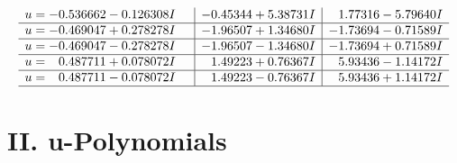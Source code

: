\documentclass[1p]{elsarticle_modified}
\theoremstyle{definition}
\begin{document}
$$\begin{array}{c|c|c}
\begin{aligned}
u &= -0.536662 - 0.126308 I\end{aligned}
 & -0.45344 + 5.38731 I & \phantom{-}1.77316 - 5.79640 I \\ \hline\begin{aligned}
u &= -0.469047 + 0.278278 I\end{aligned}
 & -1.96507 + 1.34680 I & -1.73694 - 0.71589 I \\ \hline\begin{aligned}
u &= -0.469047 - 0.278278 I\end{aligned}
 & -1.96507 - 1.34680 I & -1.73694 + 0.71589 I \\ \hline\begin{aligned}
u &= \phantom{-}0.487711 + 0.078072 I\end{aligned}
 & \phantom{-}1.49223 + 0.76367 I & \phantom{-}5.93436 - 1.14172 I \\ \hline\begin{aligned}
u &= \phantom{-}0.487711 - 0.078072 I\end{aligned}
 & \phantom{-}1.49223 - 0.76367 I & \phantom{-}5.93436 + 1.14172 I\\
 \hline 
 \end{array}$$\newpage
\newpage\renewcommand{\arraystretch}{1}
\centering \section*{ II. u-Polynomials}
\end{document}
